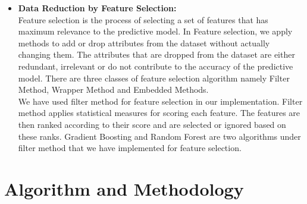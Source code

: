 \documentclass[fleqn,10pt]{SelfArx} %
\begin{document}
\begin{itemize}
	\item{\textbf{Data Reduction by Feature Selection:}}\\ 
	Feature selection is the process of selecting a set of features that has maximum relevance to the predictive model. In Feature selection, we apply methods to add or drop attributes from the dataset without actually changing them. The attributes that are dropped from the dataset are either redundant, irrelevant or do not contribute to the accuracy of the predictive model. There are three classes of feature selection algorithm namely Filter Method, Wrapper Method and Embedded Methods\cite{5}.\\
	We have used filter method for feature selection in our implementation. Filter method applies statistical measures for scoring each feature. The features are then ranked according to their score and are selected or ignored based on these ranks. Gradient Boosting and Random Forest are two algorithms under filter method that we have implemented for feature selection.


\end{itemize}

\newpage
\section{Algorithm and Methodology}
\end{document}
